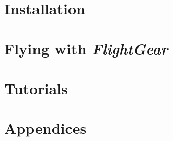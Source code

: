 \documentclass[11pt,a4paper]{book}
\newcommand{\FlightGear}{{\itshape FlightGear}}
\begin{document}


\part{Installation}


\part{Flying with \FlightGear{}}



\part{Tutorials}




\part{Appendices}
\begin{appendix}




\end{appendix}


\end{document}
